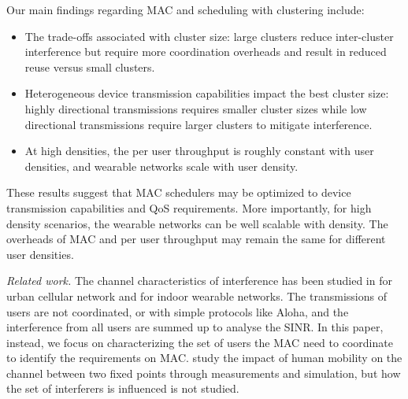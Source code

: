 \documentclass[10pt, conference, letterpaper]{IEEEtran}
\begin{document}
Our main findings regarding MAC and scheduling with clustering include:
\begin{itemize}
	\item The trade-offs associated with cluster size: large clusters reduce inter-cluster interference but require more coordination overheads and result in reduced reuse versus small clusters.
	\item Heterogeneous device transmission capabilities impact the best cluster size: highly directional transmissions requires smaller cluster sizes while low directional transmissions require larger clusters to mitigate interference. 
	\item At high densities, the per user throughput is roughly constant with user densities, and wearable networks scale with user density. %
\end{itemize}

These results suggest that MAC schedulers may be optimized to device transmission capabilities and QoS requirements. 
More importantly, for high density scenarios, the wearable networks can be well scalable with density. The overheads of MAC and per user throughput may remain the same for different user densities.

\emph{Related work.}
The channel characteristics of interference has been studied in \cite{urbanblockage} for urban cellular network and \cite{interferencefinitesized}\cite{enclosedmmwave} for indoor wearable networks. 
The transmissions of users are not coordinated, or with simple protocols like Aloha, and the interference from all users are summed up to analyse the SINR.
In this paper, instead, we focus on characterizing the set of users the MAC need to coordinate to identify the requirements on MAC.
\cite{humanactivity}\cite{timevaryingpathshadowing}\cite{blockagein60ghz} study the impact of human mobility on the channel between two fixed points through measurements and simulation, but how the set of interferers is influenced is not studied.
\end{document}
